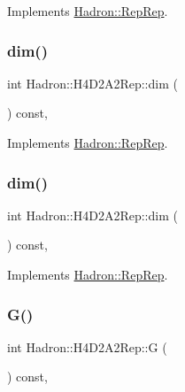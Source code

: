 Implements \mbox{\hyperlink{structHadron_1_1RepRep_a92c8802e5ed7afd7da43ccfd5b7cd92b}{Hadron\+::\+Rep\+Rep}}.

\mbox{\label{structHadron_1_1H4D2A2Rep_a5ed94d218de0113ea027710e08c23684}} 
\subsubsection{\texorpdfstring{dim()}{dim()}\hspace{0.1cm}{\footnotesize\ttfamily [2/3]}}
{\footnotesize\ttfamily int Hadron\+::\+H4\+D2\+A2\+Rep\+::dim (\begin{DoxyParamCaption}{ }\end{DoxyParamCaption}) const\hspace{0.3cm}{\ttfamily [inline]}, {\ttfamily [virtual]}}



Implements \mbox{\hyperlink{structHadron_1_1RepRep_a92c8802e5ed7afd7da43ccfd5b7cd92b}{Hadron\+::\+Rep\+Rep}}.

\mbox{\label{structHadron_1_1H4D2A2Rep_a5ed94d218de0113ea027710e08c23684}} 
\subsubsection{\texorpdfstring{dim()}{dim()}\hspace{0.1cm}{\footnotesize\ttfamily [3/3]}}
{\footnotesize\ttfamily int Hadron\+::\+H4\+D2\+A2\+Rep\+::dim (\begin{DoxyParamCaption}{ }\end{DoxyParamCaption}) const\hspace{0.3cm}{\ttfamily [inline]}, {\ttfamily [virtual]}}



Implements \mbox{\hyperlink{structHadron_1_1RepRep_a92c8802e5ed7afd7da43ccfd5b7cd92b}{Hadron\+::\+Rep\+Rep}}.

\mbox{\label{structHadron_1_1H4D2A2Rep_a07c16e2dbfa9c820954f66f17b0a270d}} 
\subsubsection{\texorpdfstring{G()}{G()}\hspace{0.1cm}{\footnotesize\ttfamily [1/2]}}
{\footnotesize\ttfamily int Hadron\+::\+H4\+D2\+A2\+Rep\+::G (\begin{DoxyParamCaption}{ }\end{DoxyParamCaption}) const\hspace{0.3cm}{\ttfamily [inline]}, {\ttfamily [virtual]}}

